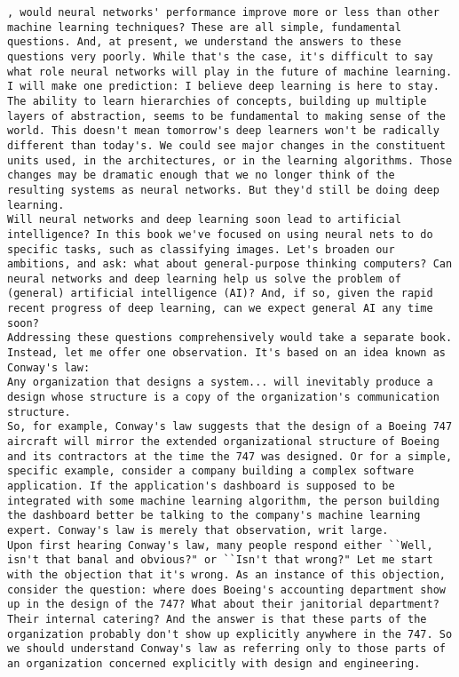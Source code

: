 \begin{lstlisting}
, would neural networks' performance improve more or less than other machine learning techniques? These are all simple, fundamental questions. And, at present, we understand the answers to these questions very poorly. While that's the case, it's difficult to say what role neural networks will play in the future of machine learning.
I will make one prediction: I believe deep learning is here to stay. The ability to learn hierarchies of concepts, building up multiple layers of abstraction, seems to be fundamental to making sense of the world. This doesn't mean tomorrow's deep learners won't be radically different than today's. We could see major changes in the constituent units used, in the architectures, or in the learning algorithms. Those changes may be dramatic enough that we no longer think of the resulting systems as neural networks. But they'd still be doing deep learning.
Will neural networks and deep learning soon lead to artificial intelligence? In this book we've focused on using neural nets to do specific tasks, such as classifying images. Let's broaden our ambitions, and ask: what about general-purpose thinking computers? Can neural networks and deep learning help us solve the problem of (general) artificial intelligence (AI)? And, if so, given the rapid recent progress of deep learning, can we expect general AI any time soon?
Addressing these questions comprehensively would take a separate book. Instead, let me offer one observation. It's based on an idea known as Conway's law: 
Any organization that designs a system... will inevitably produce a design whose structure is a copy of the organization's communication structure. 
So, for example, Conway's law suggests that the design of a Boeing 747 aircraft will mirror the extended organizational structure of Boeing and its contractors at the time the 747 was designed. Or for a simple, specific example, consider a company building a complex software application. If the application's dashboard is supposed to be integrated with some machine learning algorithm, the person building the dashboard better be talking to the company's machine learning expert. Conway's law is merely that observation, writ large.
Upon first hearing Conway's law, many people respond either ``Well, isn't that banal and obvious?" or ``Isn't that wrong?" Let me start with the objection that it's wrong. As an instance of this objection, consider the question: where does Boeing's accounting department show up in the design of the 747? What about their janitorial department? Their internal catering? And the answer is that these parts of the organization probably don't show up explicitly anywhere in the 747. So we should understand Conway's law as referring only to those parts of an organization concerned explicitly with design and engineering.

\end{lstlisting}
